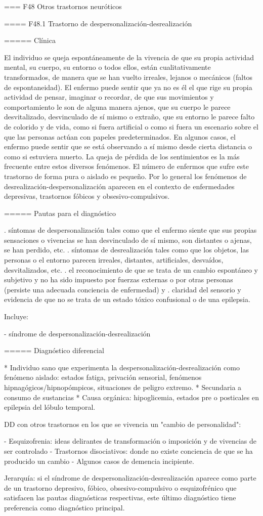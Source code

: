 === F48 Otros trastornos neuróticos

==== F48.1 Trastorno de despersonalización-desrealización

===== Clínica

El individuo se queja espontáneamente de la vivencia de que su propia actividad mental, su cuerpo, su entorno o todos ellos, están cualitativamente transformados, de manera que se han vuelto irreales, lejanos o mecánicos (faltos de espontaneidad). El enfermo puede sentir que ya no es él el que rige su propia actividad de pensar, imaginar o recordar, de que sus movimientos y comportamiento le son de alguna manera ajenos, que su cuerpo le parece desvitalizado, desvinculado de sí mismo o extraño, que su entorno le parece falto de colorido y de vida, como si fuera artificial o como si fuera un escenario sobre el que las personas actúan con papeles predeterminados. En algunos casos, el enfermo puede sentir que se está observando a sí mismo desde cierta distancia o como si estuviera muerto. La queja de pérdida de los sentimientos es la más frecuente entre estos diversos fenómenos. El número de enfermos que sufre este trastorno de forma pura o aislado es pequeño. Por lo general los fenómenos de desrealización-despersonalización aparecen en el contexto de enfermedades depresivas, trastornos fóbicos y obsesivo-compulsivos. 

===== Pautas para el diagnóstico

. síntomas de despersonalización tales como que el enfermo siente que sus propias sensaciones o vivencias se han desvinculado de sí mismo, son distantes o ajenas, se han perdido, etc.
. síntomas de desrealización tales como que los objetos, las personas o el entorno parecen irreales, distantes, artificiales, desvaídos, desvitalizados, etc.
. el reconocimiento de que se trata de un cambio espontáneo y subjetivo y no ha sido impuesto por fuerzas externas o por otras personas (persiste una adecuada conciencia de enfermedad) y
. claridad del sensorio y evidencia de que no se trata de un estado tóxico confusional o de una epilepsia.

Incluye:

- síndrome de despersonalización-desrealización

===== Diagnóstico diferencial

* Individuo sano que experimenta la despersonalización-desrealización como fenómeno aislado: estados fatiga, privación sensorial, fenómenos hipnagógicos/hipnopómpicos, situaciones de peligro extremo.
* Secundaria a consumo de sustancias
* Causa orgánica: hipoglicemia, estados pre o posticales en epilepsia del lóbulo temporal.

DD con otros trastornos en los que se vivencia un "cambio de personalidad":

- Esquizofrenia: ideas delirantes de transformación o imposición y de vivencias de ser controlado
- Trastornos disociativos: donde no existe conciencia de que se ha producido un cambio
- Algunos casos de demencia incipiente. 


Jerarquía: si el síndrome de despersonalización-desrealización aparece como parte de un trastorno depresivo, fóbico, obsesivo-compulsivo o esquizofrénico que satisfacen las pautas diagnósticas respectivas, este último diagnóstico tiene preferencia como diagnóstico principal.
